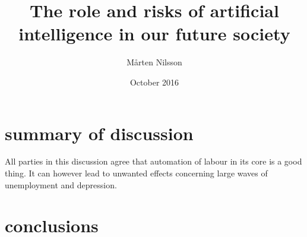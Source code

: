 \documentclass{article}
\title{ The role and risks of artificial intelligence in our future society }
\author{ Mårten Nilsson }
\date{October 2016}
\begin{document}
\maketitle

\thispagestyle{empty}

\section{summary of discussion}
All parties in this discussion agree that automation of labour in its core is a good thing. It can however lead to unwanted effects concerning large waves of unemployment and depression. 

\section{conclusions}
\end{document}
